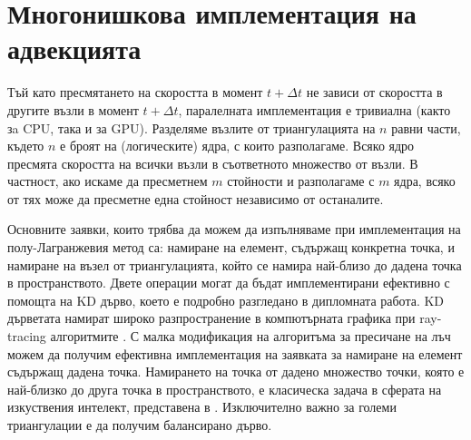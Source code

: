 \documentclass[12pt]{report}
\begin{document}
\section{Многонишкова имплементация на адвекцията}
Тъй като пресмятането на скоростта в момент $t + \Delta t$ не зависи от скоростта в другите възли в момент $t + \Delta t$, паралелната имплементация е тривиална (както зa CPU, така и за GPU). Разделяме възлите от триангулацията на $n$ равни части, където $n$ е броят на (логическите) ядра, с които разполагаме. Всяко ядро пресмята скоростта на всички възли в съответното множество от възли. В частност, ако искаме да пресметнем $m$ стойности и разполагаме с $m$ ядра, всяко от тях може да пресметне една стойност независимо от останалите.

Основните заявки, които трябва да можем да изпълняваме при имплементация на полу-Лагранжевия метод са: намиране на елемент, съдържащ конкретна точка, и намиране на възел от триангулацията, който се намира най-близо до дадена точка в пространството. Двете операции могат да бъдат имплементирани ефективно с помощта на KD дърво, което е подробно разгледано в дипломната работа. KD дърветата намират широко разпространение в компютърната графика при ray-tracing алгоритмите \cite{pbrt}. С малка модификация на алгоритъма за пресичане на лъч можем да получим ефективна имплементация на заявката за намиране на елемент съдържащ дадена точка. Намирането на точка от дадено множество точки, която е най-близко до друга точка в пространството, е класическа задача в сферата на изкуствения интелект, представена в \cite{knn-ai}. Изключително важно за големи триангулации е да получим балансирано дърво.
\end{document}
